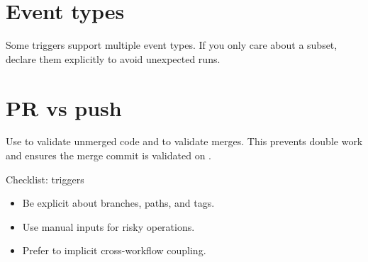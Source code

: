 \section{Event types}
Some triggers support multiple event types.
If you only care about a subset, declare them explicitly to avoid unexpected runs.

\section{PR vs push}
Use  to validate unmerged code and  to validate merges.
This prevents double work and ensures the merge commit is validated on .

\begin{checklistbox}{Checklist: triggers}
\begin{itemize}[nosep]
  \item Be explicit about branches, paths, and tags.
  \item Use manual inputs for risky operations.
  \item Prefer  to implicit cross-workflow coupling.
\end{itemize}
\end{checklistbox}
